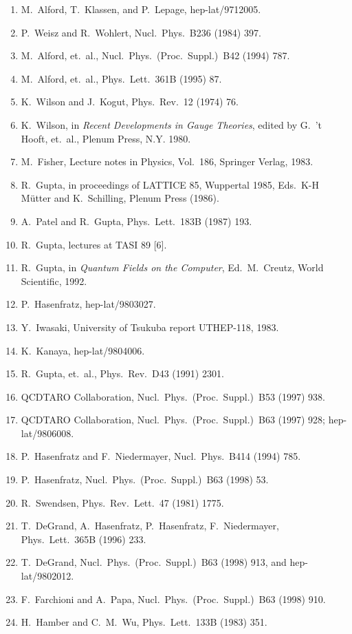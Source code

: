 \begin{enumerate}
\item M.~Alford, T.~Klassen, and P.~Lepage, hep-lat/9712005.
\item P.~Weisz and R.~Wohlert, Nucl.\ Phys.\ B236 (1984) 397.
\item M.~Alford, et.\ al., Nucl.\ Phys.\ (Proc.\ Suppl.)\ B42 (1994) 787.
\item M.~Alford, et.\ al., Phys.\ Lett.\ 361B (1995) 87.
\item K.~Wilson and J.~Kogut, Phys.\ Rev.\ 12 (1974) 76.
\item K.~Wilson, in \textit{Recent Developments in Gauge Theories}, edited by G.~'t Hooft, et.\ al., Plenum Press, N.Y. 1980.
\item M.~Fisher, Lecture notes in Physics, Vol.~186, Springer Verlag, 1983.
\item R.~Gupta, in proceedings of LATTICE 85, Wuppertal 1985, Eds.~K-H M\"utter and K.~Schilling, Plenum Press (1986).
\item A.~Patel and R.~Gupta, Phys.\ Lett.\ 183B (1987) 193.
\item R.~Gupta, lectures at TASI 89 [6].
\item R.~Gupta, in \textit{Quantum Fields on the Computer}, Ed.~M.~Creutz, World Scientific, 1992.
\item P.~Hasenfratz, hep-lat/9803027.
\item Y.~Iwasaki, University of Tsukuba report UTHEP-118, 1983.
\item K.~Kanaya, hep-lat/9804006.
\item R.~Gupta, et.\ al., Phys.\ Rev.\ D43 (1991) 2301.
\item QCDTARO Collaboration, Nucl.\ Phys.\ (Proc.\ Suppl.)\ B53 (1997) 938.
\item QCDTARO Collaboration, Nucl.\ Phys.\ (Proc.\ Suppl.)\ B63 (1997) 928; hep-lat/9806008.
\item P.~Hasenfratz and F.~Niedermayer, Nucl.\ Phys.\ B414 (1994) 785.
\item P.~Hasenfratz, Nucl.\ Phys.\ (Proc.\ Suppl.)\ B63 (1998) 53.
\item R.~Swendsen, Phys.\ Rev.\ Lett.\ 47 (1981) 1775.
\item T.~DeGrand, A.~Hasenfratz, P.~Hasenfratz, F.~Niedermayer, Phys.\ Lett.\ 365B (1996) 233.
\item T.~DeGrand, Nucl.\ Phys.\ (Proc.\ Suppl.)\ B63 (1998) 913, and hep-lat/9802012.
\item F.~Farchioni and A.~Papa, Nucl.\ Phys.\ (Proc.\ Suppl.)\ B63 (1998) 910.
\item H.~Hamber and C.~M.~Wu, Phys.\ Lett.\ 133B (1983) 351.

\end{enumerate}

